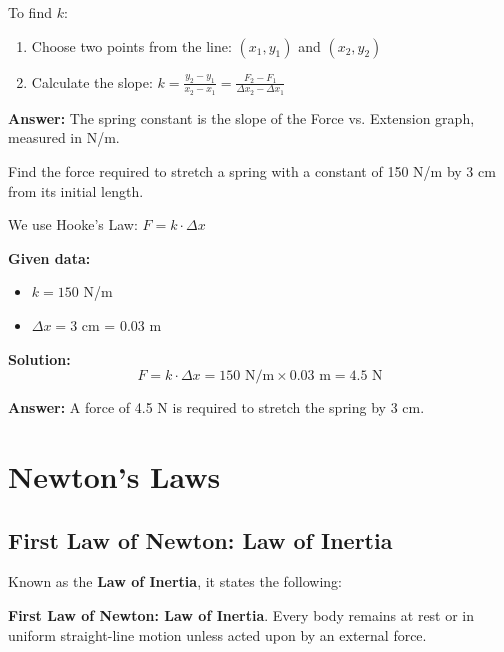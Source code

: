 \begin{exercise}
\begin{solu}
        To find $k$:
        \begin{enumerate}
            \item Choose two points from the line: $(x_1, y_1)$ and $(x_2, y_2)$
            \item Calculate the slope: $k = \frac{y_2 - y_1}{x_2 - x_1} = \frac{F_2 - F_1}{\Delta x_2 - \Delta x_1}$
        \end{enumerate}

        \textbf{Answer:} The spring constant is the slope of the Force vs. Extension graph, measured in N/m.
    \end{solu}
\end{exercise}

\begin{exercise}
    Find the force required to stretch a spring with a constant of 150 N/m by 3 cm from its initial length.

    \begin{solu}
        We use Hooke's Law: $F = k \cdot \Delta x$

        \textbf{Given data:}
        \begin{itemize}
            \item $k = 150$ N/m
            \item $\Delta x = 3$ cm = 0.03 m
        \end{itemize}

        \textbf{Solution:}
        $$F = k \cdot \Delta x = 150\text{ N/m} \times 0.03\text{ m} = 4.5\text{ N}$$

        \textbf{Answer:} A force of 4.5 N is required to stretch the spring by 3 cm.
    \end{solu}
\end{exercise}


\section{Newton's Laws}

\subsection{First Law of Newton: Law of Inertia}

Known as the \textbf{Law of Inertia}, it states the following:
\begin{dBox}
    \textbf{First Law of Newton: Law of Inertia}. Every body remains at rest or in uniform straight-line motion unless acted upon by an external force.
\end{dBox}


